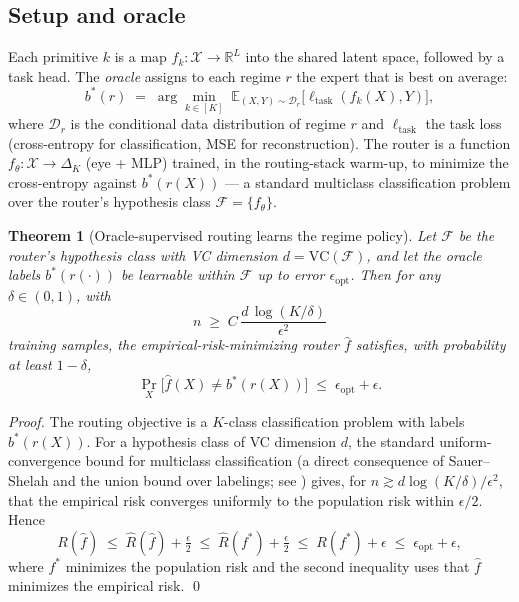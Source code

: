 \documentclass[11pt,a4paper]{article}
\newtheorem{theorem}{Theorem}
\begin{document}
\subsection{Setup and oracle}
\label{sec:theory-setup}

Each primitive $k$ is a map $f_k: \mathcal{X}\to\mathbb{R}^L$ into the shared
latent space, followed by a task head. The \emph{oracle} assigns to each regime
$r$ the expert that is best on average:
\[
  b^*(r) \;=\; \arg\min_{k\in[K]}\; \mathbb{E}_{(X,Y)\sim\mathcal{D}_r}\big[\ell_{\text{task}}(f_k(X), Y)\big],
\]
where $\mathcal{D}_r$ is the conditional data distribution of regime $r$ and
$\ell_{\text{task}}$ the task loss (cross-entropy for classification, MSE for
reconstruction). The router is a function $f_\theta: \mathcal{X}\to\Delta_K$
(eye + MLP) trained, in the routing-stack warm-up, to minimize the cross-entropy
against $b^*(r(X))$ — a standard multiclass classification problem over the
router's hypothesis class $\mathcal{F} = \{f_\theta\}$.

\begin{theorem}[Oracle-supervised routing learns the regime policy]
\label{thm:routing}
Let $\mathcal{F}$ be the router's hypothesis class with VC dimension $d =
\mathrm{VC}(\mathcal{F})$, and let the oracle labels $b^*(r(\cdot))$ be
learnable within $\mathcal{F}$ up to error $\epsilon_{\text{opt}}$. Then for any
$\delta\in(0,1)$, with
\[
  n \;\geq\; C\,\frac{d\,\log(K/\delta)}{\epsilon^{2}}
\]
training samples, the empirical-risk-minimizing router $\hat{f}$ satisfies,
with probability at least $1-\delta$,
\[
  \Pr_{X}\big[\hat{f}(X)\neq b^*(r(X))\big] \;\leq\; \epsilon_{\text{opt}} + \epsilon.
\]
\end{theorem}

\begin{proof}
The routing objective is a $K$-class classification problem with labels
$b^*(r(X))$. For a hypothesis class of VC dimension $d$, the standard
uniform-convergence bound for multiclass classification (a direct consequence
of Sauer--Shelah and the union bound over labelings; see \cite{shalevshwartz})
gives, for $n \gtrsim d\log(K/\delta)/\epsilon^2$, that the empirical risk
converges uniformly to the population risk within $\epsilon/2$. Hence
\[
  R(\hat{f}) \;\leq\; \hat{R}(\hat{f}) + \tfrac{\epsilon}{2}
  \;\leq\; \hat{R}(f^*) + \tfrac{\epsilon}{2}
  \;\leq\; R(f^*) + \epsilon
  \;\leq\; \epsilon_{\text{opt}} + \epsilon,
\]
where $f^*$ minimizes the population risk and the second inequality uses that
$\hat{f}$ minimizes the empirical risk. \qed
\end{proof}
\end{document}

